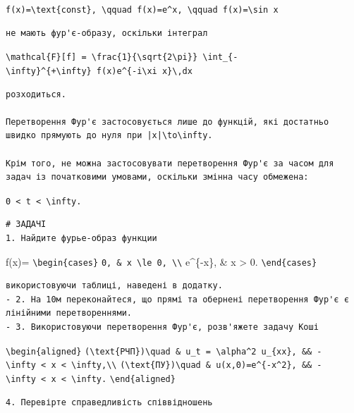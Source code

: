 \documentclass[
  ukrainian,
]{article}
\begin{document}
\texttt{f(x)=\textbackslash{}text\{const\},\ \textbackslash{}qquad\ f(x)=e\^{}x,\ \textbackslash{}qquad\ f(x)=\textbackslash{}sin\ x}

\begin{verbatim}
не мають фур'є-образу, оскільки інтеграл
\end{verbatim}

\texttt{\textbackslash{}mathcal\{F\}{[}f{]}\ =\ \textbackslash{}frac\{1\}\{\textbackslash{}sqrt\{2\textbackslash{}pi\}\}\ \textbackslash{}int\_\{-\textbackslash{}infty\}\^{}\{+\textbackslash{}infty\}\ f(x)e\^{}\{-i\textbackslash{}xi\ x\}\textbackslash{},dx}

\begin{verbatim}
розходиться.

Перетворення Фур'є застосовується лише до функцій, які достатньо швидко прямують до нуля при |x|\to\infty.

Крім того, не можна застосовувати перетворення Фур'є за часом для задач із початковими умовами, оскільки змінна часу обмежена:
\end{verbatim}

\texttt{0\ \textless{}\ t\ \textless{}\ \textbackslash{}infty.}

\begin{verbatim}
# ЗАДАЧІ
1. Найдите фурье-образ функции
\end{verbatim}

f(x)= \texttt{\textbackslash{}begin\{cases\}}
\texttt{0,\ \&\ x\ \textbackslash{}le\ 0,\ \textbackslash{}\textbackslash{}}
e\^{}\{-x\}, \& x \textgreater{} 0.
\texttt{\textbackslash{}end\{cases\}}

\begin{verbatim}
використовуючи таблиці, наведені в додатку.
- 2. На 10м переконайтеся, що прямі та обернені перетворення Фур'є є лінійними перетвореннями.
- 3. Використовуючи перетворення Фур'є, розв'яжете задачу Коші
\end{verbatim}

\texttt{\textbackslash{}begin\{aligned\}}
\texttt{(\textbackslash{}text\{РЧП\})\textbackslash{}quad\ \&\ u\_t\ =\ \textbackslash{}alpha\^{}2\ u\_\{xx\},\ \&\&\ -\textbackslash{}infty\ \textless{}\ x\ \textless{}\ \textbackslash{}infty,\textbackslash{}\textbackslash{}}
\texttt{(\textbackslash{}text\{ПУ\})\textbackslash{}quad\ \&\ u(x,0)=e\^{}\{-x\^{}2\},\ \&\&\ -\textbackslash{}infty\ \textless{}\ x\ \textless{}\ \textbackslash{}infty.}
\texttt{\textbackslash{}end\{aligned\}}

\begin{verbatim}
4. Перевірте справедливість співвідношень
\end{verbatim}
\end{document}
